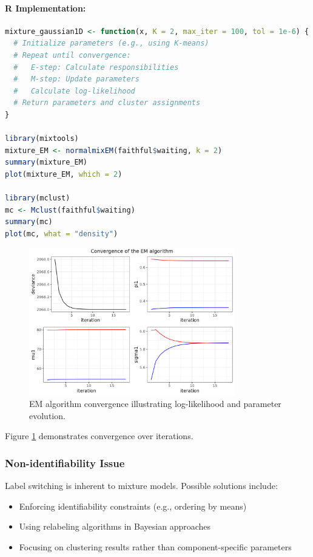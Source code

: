 \documentclass[11pt,a4paper]{article}
\begin{document}
\paragraph{R Implementation:}
\begin{lstlisting}[language=R]
mixture_gaussian1D <- function(x, K = 2, max_iter = 100, tol = 1e-6) {
  # Initialize parameters (e.g., using K-means)
  # Repeat until convergence:
  #   E-step: Calculate responsibilities
  #   M-step: Update parameters
  #   Calculate log-likelihood
  # Return parameters and cluster assignments
}

library(mixtools)
mixture_EM <- normalmixEM(faithful$waiting, k = 2)
summary(mixture_EM)
plot(mixture_EM, which = 2)

library(mclust)
mc <- Mclust(faithful$waiting)
summary(mc)
plot(mc, what = "density")
\end{lstlisting}

\begin{figure}[htb]
    \centering
    \includegraphics[width=0.8\textwidth]{em-convergence.png}
    \caption{EM algorithm convergence illustrating log-likelihood and parameter evolution.}
    \label{fig:em-convergence}
\end{figure}

Figure \ref{fig:em-convergence} demonstrates convergence over iterations.

\subsubsection{Non-identifiability Issue}
Label switching is inherent to mixture models. Possible solutions include:
\begin{itemize}
  \item Enforcing identifiability constraints (e.g., ordering by means)
  \item Using relabeling algorithms in Bayesian approaches
  \item Focusing on clustering results rather than component-specific parameters
\end{itemize}
\end{document}
